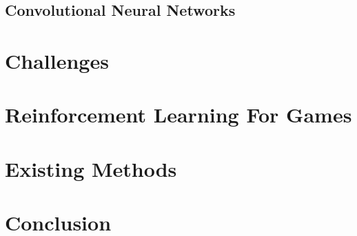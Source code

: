 \subsection{Convolutional Neural Networks}

\section{Challenges}

\section{Reinforcement Learning For Games}

\section{Existing Methods}

\section{Conclusion}

